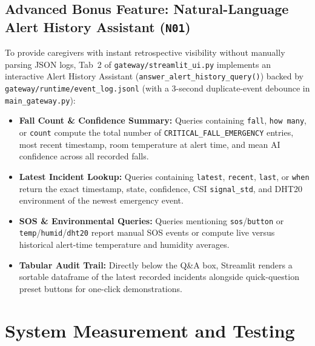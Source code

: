 \documentclass{hcmut-report}
\begin{document}
\subsection[Advanced Bonus Feature: Alert History Assistant (\texttt{N01})]{Advanced Bonus Feature: Natural-Language Alert History Assistant (\texttt{N01})}
To provide caregivers with instant retrospective visibility without manually parsing JSON logs, Tab~2 of \texttt{gateway/streamlit\_ui.py} implements an interactive Alert History Assistant (\texttt{answer\_alert\_history\_query()}) backed by \texttt{gateway/runtime/event\_log.jsonl} (with a 3-second duplicate-event debounce in \texttt{main\_gateway.py}):
\begin{itemize}
  \item \textbf{Fall Count \& Confidence Summary:} Queries containing \texttt{fall}, \texttt{how many}, or \texttt{count} compute the total number of \texttt{CRITICAL\_FALL\_EMERGENCY} entries, most recent timestamp, room temperature at alert time, and mean AI confidence across all recorded falls.
  \item \textbf{Latest Incident Lookup:} Queries containing \texttt{latest}, \texttt{recent}, \texttt{last}, or \texttt{when} return the exact timestamp, state, confidence, CSI \texttt{signal\_std}, and DHT20 environment of the newest emergency event.
  \item \textbf{SOS \& Environmental Queries:} Queries mentioning \texttt{sos}/\texttt{button} or \texttt{temp}/\texttt{humid}/\texttt{dht20} report manual SOS events or compute live versus historical alert-time temperature and humidity averages.
  \item \textbf{Tabular Audit Trail:} Directly below the Q\&A box, Streamlit renders a sortable dataframe of the latest recorded incidents alongside quick-question preset buttons for one-click demonstrations.
\end{itemize}

\section{System Measurement and Testing}
\end{document}
